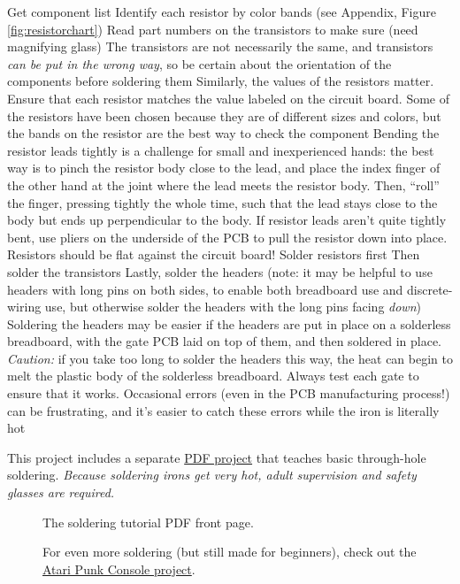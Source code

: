 \+ Get component list 
\+ Identify each resistor by color bands (see Appendix, Figure \ref{fig:resistorchart})
\+ Read part numbers on the transistors to make sure (need magnifying glass)
\+ The transistors are not necessarily the same, and transistors \emph{can be put in the wrong way}, so be certain about the orientation of the components before soldering them
\+ Similarly, the values of the resistors matter. Ensure that each resistor matches the value labeled on the circuit board. Some of the resistors have been chosen because they are of different sizes and colors, but the bands on the resistor are the best way to check the component
\+ Bending the resistor leads tightly is a challenge for small and inexperienced hands: the best way is to pinch the resistor body close to the lead, and place the index finger of the other hand at the joint where the lead meets the resistor body. Then, ``roll'' the finger, pressing tightly the whole time, such that the lead stays close to the body but ends up perpendicular to the body.
\+ If resistor leads aren't quite tightly bent, use pliers on the underside of the PCB to pull the resistor down into place.
\+ Resistors should be flat against the circuit board!
\+ Solder resistors first
\+ Then solder the transistors
\+ Lastly, solder the headers (note: it may be helpful to use headers with long pins on both sides, to enable both breadboard use and discrete-wiring use, but otherwise solder the headers with the long pins facing \emph{down})
\+ Soldering the headers may be easier if the headers are put in place on a solderless breadboard, with the gate PCB laid on top of them, and then soldered in place. \emph{Caution:} if you take too long to solder the headers this way, the heat can begin to melt the plastic body of the solderless breadboard.
\+ Always test each gate to ensure that it works. Occasional errors (even in the PCB manufacturing process!) can be frustrating, and it's easier to catch these errors while the iron is literally hot

\ei

\pagebreak
This project includes a separate {\color{webblue}\href{https://github.com/jessehamner/TechMillForKids/tree/master/soldering}{PDF project}} that teaches basic through-hole soldering. \emph{Because soldering irons get very hot, adult supervision and safety glasses are required.}

\begin{figure}[hb!]
\begin{center}
\end{center}
\caption{The soldering tutorial PDF front page.}
\label{fig:soldering}
\end{figure}

\begin{figure}[hb!]
\begin{center}
\end{center}
\caption{For even more soldering (but still made for beginners), check out the {\color{webblue}\href{https://github.com/jessehamner/AtariPunkConsole}{Atari Punk Console project}}.}
\label{fig:soldering}
\end{figure} 

\clearpage